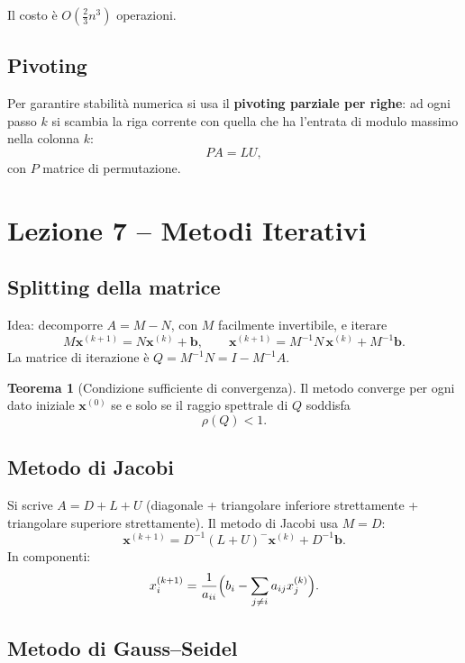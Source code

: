 \documentclass[12pt,a4paper]{article}
\theoremstyle{definition}
\newtheorem{teorema}{Teorema}[section]
\begin{document}
Il costo è $O\!\left(\tfrac{2}{3}n^3\right)$ operazioni.

\subsection{Pivoting}

Per garantire stabilità numerica si usa il \textbf{pivoting parziale per righe}: ad ogni passo $k$ si scambia la riga corrente con quella che ha l'entrata di modulo massimo nella colonna $k$:
\[
  PA = LU,
\]
con $P$ matrice di permutazione.

\section{Lezione 7 -- Metodi Iterativi}

\subsection{Splitting della matrice}

Idea: decomporre $A = M - N$, con $M$ facilmente invertibile, e iterare
\[
  M\mathbf{x}^{(k+1)} = N\mathbf{x}^{(k)} + \mathbf{b},
  \qquad \mathbf{x}^{(k+1)} = M^{-1}N\,\mathbf{x}^{(k)} + M^{-1}\mathbf{b}.
\]
La matrice di iterazione è $Q = M^{-1}N = I - M^{-1}A$.

\begin{teorema}[Condizione sufficiente di convergenza]
Il metodo converge per ogni dato iniziale $\mathbf{x}^{(0)}$ se e solo se il raggio spettrale di $Q$ soddisfa
\[
  \rho(Q) < 1.
\]
\end{teorema}

\subsection{Metodo di Jacobi}

Si scrive $A = D + L + U$ (diagonale + triangolare inferiore strettamente + triangolare superiore strettamente). Il metodo di Jacobi usa $M = D$:
\[
  \mathbf{x}^{(k+1)} = D^{-1}(L + U)^{-}\mathbf{x}^{(k)} + D^{-1}\mathbf{b}.
\]
In componenti:
\[
  x_i^{(k+1)} = \frac{1}{a_{ii}}\Bigl(b_i - \sum_{j \neq i} a_{ij} x_j^{(k)}\Bigr).
\]

\subsection{Metodo di Gauss--Seidel}
\end{document}
